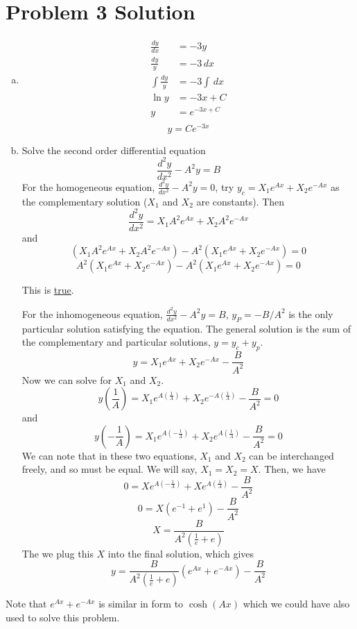 \documentclass{report}
\begin{document}
\newpage


\section*{Problem 3 Solution}


\begin{enumerate}[a)]

\item 

\begin{align*}
\frac{dy}{dx}	&= -3y \\
\frac{dy}{y} 	& = -3\,dx \\
\int\frac{dy}{y}&= -3 \int \,dx \\
\ln y			&= -3 x + C \\
y				&= e^{-3x + C} \\
\end{align*}
$$\boxed{y = Ce^{-3x}}$$

\item 

Solve the second order differential equation
$$ \frac{d^2 y}{dx^2} - A^2y = B $$
For the homogeneous equation, $\frac{d^2 y}{dx^2} - A^2y = 0$, try $y_c = X_1 e^{Ax} + X_2 e^{-Ax}$ as the complementary solution ($X_1$ and $X_2$ are constants). Then
$$ \frac{d^2 y}{dx^2} = X_1 A^2 e^{Ax} + X_2 A^2 e^{-Ax} $$
and
$$ (X_1 A^2 e^{Ax} + X_2 A^2 e^{-Ax}) - A^2(X_1 e^{Ax} + X_2 e^{-Ax}) = 0 $$
$$ A^2 (X_1 e^{Ax} + X_2 e^{-Ax}) - A^2 (X_1 e^{Ax} + X_2 e^{-Ax}) = 0 $$

This is \underline{true}.

For the inhomogeneous equation, $\frac{d^2 y}{dx^2} - A^2y = B$, $y_P = -B/A^2$ is the only particular solution satisfying the equation. The general solution is the sum of the complementary and particular solutions, $y = y_c + y_p$. 
$$ y = X_1 e^{Ax} + X_2 e^{-Ax} - \frac{B}{A^2} $$
Now we can solve for $X_1$ and $X_2$. 
$$ y(\frac{1}{A}) = X_1 e^{A(\frac{1}{A})} + X_2 e^{-A(\frac{1}{A})} - \frac{B}{A^2} = 0 $$
and
$$ y(-\frac{1}{A}) = X_1 e^{A(-\frac{1}{A})} + X_2 e^{A(\frac{1}{A})} - \frac{B}{A^2} = 0 $$
We can note that in these two equations, $X_1$ and $X_2$ can be interchanged freely, and so must be equal. We will say, $X_1 = X_2 = X$. Then, we have
$$ 0 = X e^{A(-\frac{1}{A})} + X e^{A(\frac{1}{A})} - \frac{B}{A^2} $$
$$ 0 = X (e^{-1} + e^{1}) - \frac{B}{A^2} $$
$$ X = \frac{B}{A^2(\frac{1}{e} + e)} $$
The we plug this $X$ into the final solution, which gives
$$ y = \frac{B}{A^2(\frac{1}{e} + e)} (e^{Ax} + e^{-Ax}) - \frac{B}{A^2} $$
\end{enumerate}
Note that $e^{Ax} + e^{-Ax}$ is similar in form to $\cosh(Ax)$ which we could have also used to solve this problem.
\end{document}
